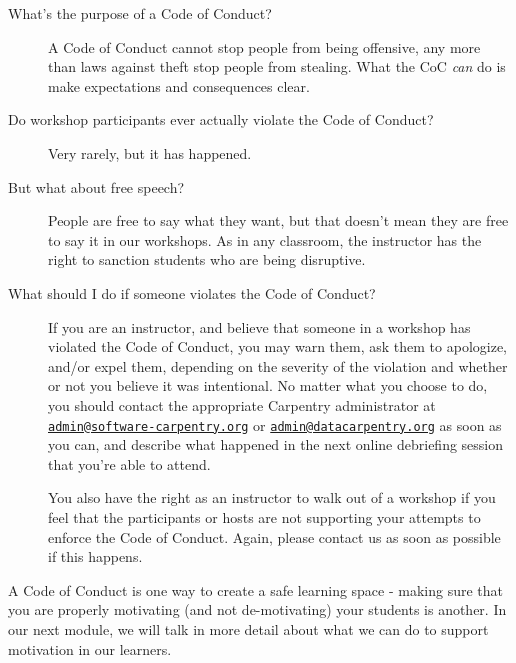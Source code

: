 \begin{description}
\item[What's the purpose of a Code of Conduct?]
A Code of Conduct cannot stop people from being offensive, any more than
laws against theft stop people from stealing. What the CoC \emph{can} do
is make expectations and consequences clear.
\item[Do workshop participants ever actually violate the Code of
Conduct?]
Very rarely, but it has happened.
\item[But what about free speech?]
People are free to say what they want, but that doesn't mean they are
free to say it in our workshops. As in any classroom, the instructor has
the right to sanction students who are being disruptive.
\item[What should I do if someone violates the Code of Conduct?]
If you are an instructor, and believe that someone in a workshop has
violated the Code of Conduct, you may warn them, ask them to apologize,
and/or expel them, depending on the severity of the violation and
whether or not you believe it was intentional. No matter what you choose
to do, you should contact the appropriate Carpentry administrator at
\href{mailto:admin@software-carpentry.org}{\nolinkurl{admin@software-carpentry.org}}
or
\href{mailto:admin@datacarpentry.org}{\nolinkurl{admin@datacarpentry.org}}
as soon as you can, and describe what happened in the next online
debriefing session that you're able to attend.

You also have the right as an instructor to walk out of a workshop if
you feel that the participants or hosts are not supporting your attempts
to enforce the Code of Conduct. Again, please contact us as soon as
possible if this happens.
\end{description}

A Code of Conduct is one way to create a safe learning space - making
sure that you are properly motivating (and not de-motivating) your
students is another. In our next module, we will talk in more detail
about what we can do to support motivation in our learners.

